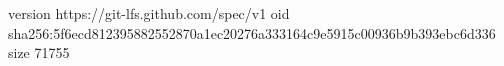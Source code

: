 version https://git-lfs.github.com/spec/v1
oid sha256:5f6ecd812395882552870a1ec20276a333164c9e5915c00936b9b393ebc6d336
size 71755
